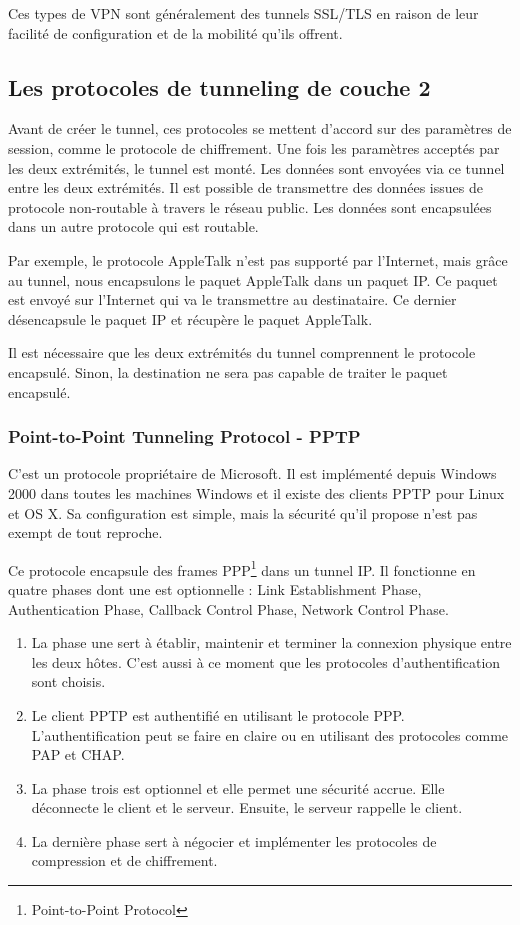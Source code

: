 Ces types de VPN sont généralement des tunnels SSL/TLS en raison de leur facilité de configuration et de la mobilité qu'ils offrent.

\subsection{Les protocoles de tunneling de couche 2}
Avant de créer le tunnel, ces protocoles se mettent d'accord sur des paramètres de session, comme le protocole de chiffrement.
Une fois les paramètres acceptés par les deux extrémités, le tunnel est monté.
Les données sont envoyées via ce tunnel entre les deux extrémités.
Il est possible de transmettre des données issues de protocole non-routable à travers le réseau public. 
Les données sont encapsulées dans un autre protocole qui est routable.

Par exemple, le protocole AppleTalk n'est pas supporté par l'Internet, mais grâce au tunnel, nous encapsulons le paquet AppleTalk dans un paquet IP. 
Ce paquet est envoyé sur l'Internet qui va le transmettre au destinataire.
Ce dernier désencapsule le paquet IP et récupère le paquet AppleTalk. 

Il est nécessaire que les deux extrémités du tunnel comprennent le protocole encapsulé.
Sinon, la destination ne sera pas capable de traiter le paquet encapsulé. 

\subsubsection{Point-to-Point Tunneling Protocol - PPTP}
C'est un protocole propriétaire de Microsoft.
Il est implémenté depuis Windows 2000 dans toutes les machines Windows et il existe des clients PPTP pour Linux et OS X.
Sa configuration est simple, mais la sécurité qu'il propose n'est pas exempt de tout reproche.

Ce protocole encapsule des frames PPP\footnote{Point-to-Point Protocol} dans un tunnel IP.
Il fonctionne en quatre phases dont une est optionnelle : Link Establishment Phase, Authentication Phase, Callback Control Phase, Network Control Phase.
\begin{enumerate}
	\item La phase une sert à établir, maintenir et terminer la connexion physique entre les deux hôtes. C'est aussi à ce moment que les protocoles d'authentification sont choisis.
	\item Le client PPTP est authentifié en utilisant le protocole PPP. L'authentification peut se faire en claire ou en utilisant des protocoles comme PAP et CHAP. 
	\item La phase trois est optionnel et elle permet une sécurité accrue. Elle déconnecte le client et le serveur. Ensuite, le serveur rappelle le client. 
	\item La dernière phase sert à négocier et implémenter les protocoles de compression et de chiffrement.
\end{enumerate}
